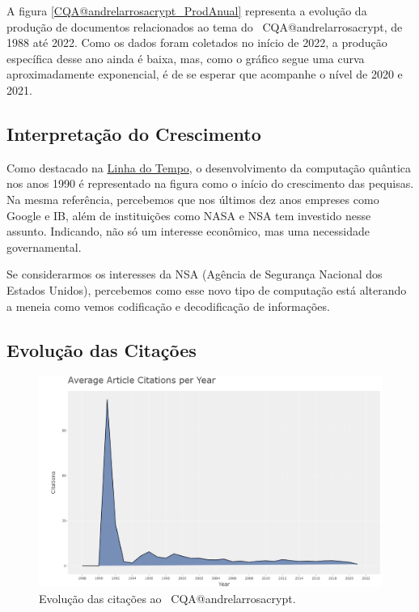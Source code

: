 A figura \ref{CQA@andrelarrosacrypt_ProdAnual} representa a evolução da produção de documentos relacionados ao tema do \dataset\ CQA@andrelarrosacrypt, de 1988 até 2022. Como os dados foram coletados no início de 2022, a produção específica desse ano ainda é baixa, mas, como o gráfico segue uma curva aproximadamente exponencial, é de se esperar que acompanhe o nível de 2020 e 2021.



\subsection{Interpretação do Crescimento}

Como destacado na \href{https://www.quthought.com/post/history-of-quantum-computing-a-timeline}{Linha do Tempo}, o desenvolvimento da computação quântica nos anos 1990 é representado na figura como o início do crescimento das pequisas. Na mesma referência, percebemos que nos últimos dez anos empreses como Google e IB, além de instituições como NASA e NSA tem investido nesse assunto. Indicando, não só um interesse econômico, mas uma necessidade governamental.

Se considerarmos os interesses da NSA (Agência de Segurança Nacional dos Estados Unidos), percebemos como esse novo tipo de computação está alterando a meneia como vemos codificação e decodificação de informações. 


\subsection{Evolução das Citações}

\begin{figure}
    \centering
    \includegraphics[width=1\textwidth]{experiments/andrelarrosacrypt/AnaliseBibliometrica/CriptografiaQuantica/imagens/CQA@andrelarrosacrypt_CitaAnual.png}
    \caption{Evolução das citações ao \dataset\ CQA@andrelarrosacrypt.}
    \label{CQA@andrelarrosacrypt_CitaAnual}
\end{figure}


